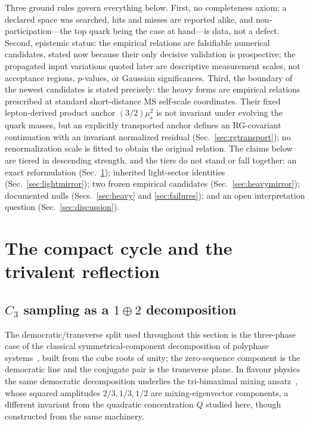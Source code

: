 \documentclass[aps,twocolumn,superscriptaddress,nofootinbib,floatfix]{revtex4-2}
\newcommand{\MSbar}{\overline{\mathrm{MS}}}
\newcommand{\mstar}{\mu_\star}
\begin{document}
Three ground rules govern everything below. First, no completeness axiom: a declared space was searched, hits and misses are reported alike, and non-participation---the top quark being the case at hand---is data, not a defect. Second, epistemic status: the empirical relations are falsifiable numerical candidates, stated now because their only decisive validation is prospective; the propagated input variations quoted later are descriptive measurement scales, not acceptance regions, $p$-values, or Gaussian significances. Third, the boundary of the newest candidates is stated precisely: the heavy forms are empirical relations prescribed at standard short-distance $\MSbar$ self-scale coordinates. Their fixed lepton-derived product anchor $(3/2)\mstar^2$ is not invariant under evolving the quark masses, but an explicitly transported anchor defines an RG-covariant continuation with an invariant normalized residual (Sec.~\ref{sec:rgtransport}); no renormalization scale is fitted to obtain the original relation. The claims below are tiered in descending strength, and the tiers do not stand or fall together: an exact reformulation (Sec.~\ref{sec:c3}); inherited light-sector identities (Sec.~\ref{sec:lightmirror}); two frozen empirical candidates (Sec.~\ref{sec:heavymirror}); documented nulls (Secs.~\ref{sec:heavy} and \ref{sec:failures}); and an open interpretation question (Sec.~\ref{sec:discussion}).


\section{The compact cycle and the trivalent reflection}
\label{sec:c3}

\subsection{$C_3$ sampling as a $1\oplus2$ decomposition}

The democratic/transverse split used throughout this section is the three-phase case of the classical symmetrical-component decomposition of polyphase systems~\cite{Fortescue1918}, built from the cube roots of unity; the zero-sequence component is the democratic line and the conjugate pair is the transverse plane. In flavour physics the same democratic decomposition underlies the tri-bimaximal mixing ansatz~\cite{HPS2002}, whose squared amplitudes $2/3,1/3,1/2$ are mixing-eigenvector components, a different invariant from the quadratic concentration $Q$ studied here, though constructed from the same machinery.
\end{document}
